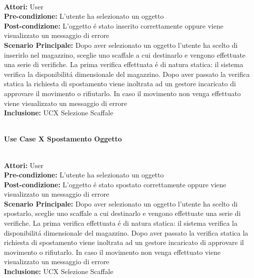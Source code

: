 \vspace{0.5cm}

\large\textbf{} \\
\textbf{Attori:} User\\
\textbf{Pre-condizione:} L'utente ha selezionato un oggetto  \\
\textbf{Post-condizione: } L'oggetto é stato inserito correttamente oppure viene visualizzato un messaggio di errore\\
\textbf{Scenario Principale:}  Dopo aver selezionato un oggetto l'utente ha scelto di inserirlo nel magazzino, sceglie uno scaffale a cui destinarlo e vengono effettuate una serie di verifiche. La prima verifica effettuata é di natura statica: il sistema verifica la disponibilitá dimensionale del magazzino. Dopo aver passato la verifica statica la richiesta di spostamento viene inoltrata ad un gestore incaricato di approvare il movimento o rifiutarlo. In caso il movimento non venga effettuato viene visualizzato un messaggio di errore \\
\textbf{Inclusione:} UCX Selezione Scaffale \\

\vspace{0.5cm}

\Large\textbf{}\\
\Large\textbf{Use Case X Spostamento Oggetto} \\

\vspace{0.5cm}

\large\textbf{} \\
\textbf{Attori:} User\\
\textbf{Pre-condizione:} L'utente ha selezionato un oggetto  \\
\textbf{Post-condizione: } L'oggetto é stato spostato correttamente oppure viene visualizzato un messaggio di errore\\
\textbf{Scenario Principale:}  Dopo aver selezionato un oggetto l'utente ha scelto di spostarlo, sceglie uno scaffale a cui destinarlo e vengono effettuate una serie di verifiche. La prima verifica effettuata é di natura statica: il sistema verifica la disponibilitá dimensionale del magazzino. Dopo aver passato la verifica statica la richiesta di spostamento viene inoltrata ad un gestore incaricato di approvare il movimento o rifiutarlo. In caso il movimento non venga effettuato viene visualizzato un messaggio di errore \\
\textbf{Inclusione:} UCX Selezione Scaffale \\

